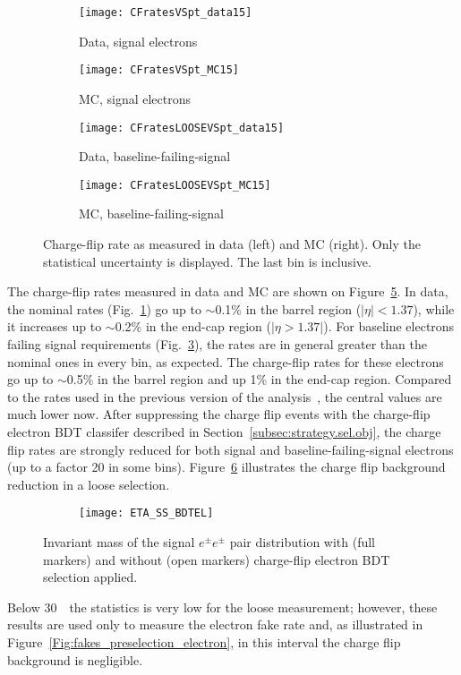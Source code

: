 \begin{figure}[t!]
\centering
\begin{subfigure}[b]{0.45\textwidth}
	\texttt{[image: CFratesVSpt\_data15]}
	\caption{Data, signal electrons}\label{fig:Chflip_nominalData}
\end{subfigure}
\begin{subfigure}[b]{0.45\textwidth}
	\texttt{[image: CFratesVSpt\_MC15]}
	\caption{MC, signal electrons}\label{fig:Chflip_nominalMC}
\end{subfigure}
\begin{subfigure}[b]{0.45\textwidth}
	\texttt{[image: CFratesLOOSEVSpt\_data15]}
	\caption{Data, baseline-failing-signal}\label{fig:Chflip_looseData}
\end{subfigure}
\begin{subfigure}[b]{0.45\textwidth}
	\texttt{[image: CFratesLOOSEVSpt\_MC15]}
	\caption{MC, baseline-failing-signal}\label{fig:Chflip_looseMC}
\end{subfigure}
\caption{Charge-flip rate as measured in data (left) and MC (right). 
Only the statistical uncertainty is displayed. The last \pt bin is inclusive.}
\label{fig:ChFlip_Rate}
\end{figure}

The charge-flip rates measured in data and MC are shown on Figure~\ref{fig:ChFlip_Rate}. 
 In data, the nominal rates (Fig.~\ref{fig:Chflip_nominalData}) go up to $\sim$0.1\% in the barrel region ($|\eta| < 1.37$), 
 while it increases up to $\sim$0.2\% in the end-cap region ($|\eta > 1.37|$). 
 For baseline electrons failing signal requirements (Fig.~\ref{fig:Chflip_looseData}), 
 the rates are in general greater than the nominal ones in every bin, as expected. The charge-flip rates for these electrons go up to $\sim$0.5\% in the barrel region and up 1\% in the end-cap region. Compared to the rates used in the previous version of the analysis~\cite{ATLAS-CONF-2016-037}, the central values are much lower now. After suppressing the charge flip events with the charge-flip 
electron BDT classifer described in Section~\ref{subsec:strategy.sel.obj}, 
the charge flip rates are strongly reduced for both signal and baseline-failing-signal electrons (up to a factor 20 in some bins). Figure~\ref{fig:ETA_SS_BDTEL}
illustrates the charge flip background reduction in a loose selection.
\begin{figure}[htb!]
\centering
\begin{subfigure}[t]{0.66\textwidth}\texttt{[image: ETA\_SS\_BDTEL]}\end{subfigure}
\caption{Invariant mass of the signal $e^{\pm} e^{\pm}$ pair distribution with (full markers) and without (open markers) charge-flip electron BDT selection applied.
}
\label{fig:ETA_SS_BDTEL}
\end{figure}
Below 30~\GeV\, the statistics is very low for the loose measurement; however, these results are used only to measure the electron fake rate and, as illustrated in Figure~\ref{Fig:fakes_preselection_electron}, in this \pt interval the charge flip background is negligible.

